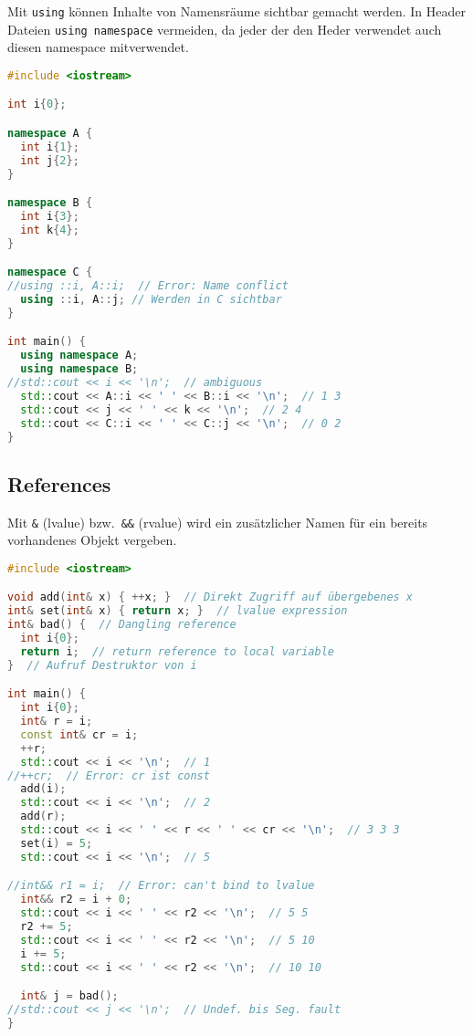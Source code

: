 \documentclass[10pt,twocolumn]{scrartcl}
\begin{document}
Mit \lstinline|using| können Inhalte von Namensräume sichtbar gemacht werden. In
Header Dateien \lstinline|using namespace| vermeiden, da jeder der den Heder
verwendet auch diesen namespace mitverwendet.

\begin{lstlisting}[language=C++]
#include <iostream>

int i{0};

namespace A {
  int i{1};
  int j{2};
}

namespace B {
  int i{3};
  int k{4};
}

namespace C {
//using ::i, A::i;  // Error: Name conflict
  using ::i, A::j; // Werden in C sichtbar
}

int main() {
  using namespace A;
  using namespace B;
//std::cout << i << '\n';  // ambiguous
  std::cout << A::i << ' ' << B::i << '\n';  // 1 3
  std::cout << j << ' ' << k << '\n';  // 2 4
  std::cout << C::i << ' ' << C::j << '\n';  // 0 2
}
\end{lstlisting}

\subsection{References}

Mit \lstinline|&| (lvalue) bzw.\ \lstinline|&&| (rvalue) wird ein zusätzlicher
Namen für ein bereits vorhandenes Objekt vergeben.

\begin{lstlisting}[language=C++]
#include <iostream>

void add(int& x) { ++x; }  // Direkt Zugriff auf übergebenes x
int& set(int& x) { return x; }  // lvalue expression
int& bad() {  // Dangling reference
  int i{0};
  return i;  // return reference to local variable
}  // Aufruf Destruktor von i

int main() {
  int i{0};
  int& r = i;
  const int& cr = i;
  ++r;
  std::cout << i << '\n';  // 1
//++cr;  // Error: cr ist const
  add(i);
  std::cout << i << '\n';  // 2
  add(r);
  std::cout << i << ' ' << r << ' ' << cr << '\n';  // 3 3 3
  set(i) = 5;
  std::cout << i << '\n';  // 5

//int&& r1 = i;  // Error: can't bind to lvalue
  int&& r2 = i + 0;
  std::cout << i << ' ' << r2 << '\n';  // 5 5
  r2 += 5;
  std::cout << i << ' ' << r2 << '\n';  // 5 10
  i += 5;
  std::cout << i << ' ' << r2 << '\n';  // 10 10

  int& j = bad();
//std::cout << j << '\n';  // Undef. bis Seg. fault
}
\end{lstlisting}
\end{document}
